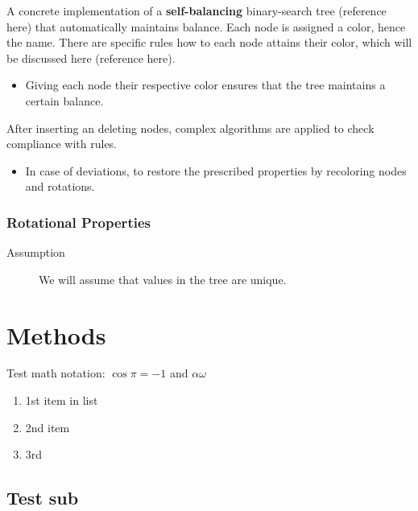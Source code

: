 \documentclass[10pt, 
a4paper, 
oneside, 
headinclude, footinclude, 
BCOR5mm]
{scrartcl}
\begin{document}
\begin{definition}  
\end{definition}
A concrete implementation of a \textbf{self-balancing} binary-search tree (reference here) that automatically maintains balance. 
Each node is assigned a color, hence the name. There are specific rules how to each node attains their color, which will be discussed here (reference here). 
\begin{itemize}
    \item Giving each node their respective color ensures that the tree maintains a certain balance.
\end{itemize}
After inserting an deleting nodes, complex algorithms are applied to check compliance with rules.
\begin{itemize}
     \item In case of deviations, to restore the prescribed properties by recoloring nodes and rotations.
\end{itemize} 

\subsubsection{Rotational Properties}

\begin{description}
    \item[Assumption] We will assume that values in the tree are unique. 
\end{description}
\newpage








\section{Methods}

Test math notation: $\cos\pi=-1$ and $\alpha\omega$

\begin{enumerate}
    \item 1st item in list
    \item 2nd item 
    \item 3rd
\end{enumerate}

\subsection{Test sub}
\end{document}
